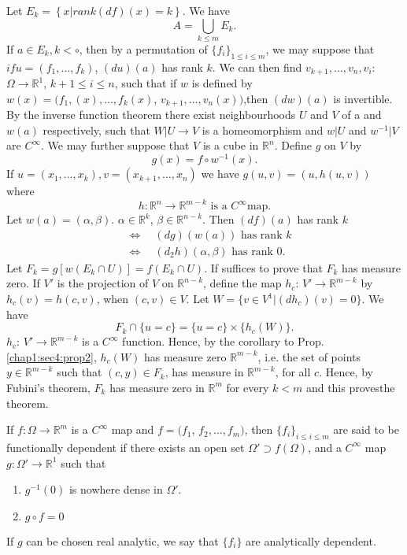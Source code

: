 \setcounter{proof of theorem}{0}
\begin{proof of theorem}\label{chap1:sec4:pot1}%
  Let $E_k = \left\{ x | rank (df)(x) = k\right\}$. We have 
  $$
  A = \bigcup _{ k \leq m} E_k. 
  $$
  If $a \in E_k, k <\circ$, then by a permutation of $\{f_i\} _{ 1 \leq i \leq
    m}$, we may suppose that $if u = ( f _1, \ldots, f_k)$, $(du) (a)$
  has rank $k$. We can then find $v_{ k +1},\ldots , v_n , v_i$:
  $\Omega \to \mathbb{R}^1$, $k +1 \leq i \leq n$, such that if $w$ is
  defined by $w(x) = (f_1, (x) , \ldots , f_k (x)$, $v_{k +1} , \ldots
  , v_n (x))$,\pageoriginale then $(dw) (a)$ is invertible. By the inverse function
  theorem there exist neighbourhoods $U$ and $V$ of a and $w(a)$
  respectively, such that $W | U \to V$ is a homeomorphism and $w | U$
  and $w^{-1} | V $ are $C^\infty$. We may further suppose that $V$ is
  a cube in $\mathbb{R}^n$. Define $g$ on $V$ by  
  $$
  g(x) = f \circ w ^{-1} (x).
  $$
  If $u = (x_1, \ldots , x_k) , v = (x_{k +1}, \ldots , x_n)$ we have
  $g (u, v) = (u, h (u, v))$ where  
  $$
  h : \mathbb{R}^n \to \mathbb{R}^{ m- k} \text{ is a } C^\infty \text{map}. 
  $$
  Let $w (a) = (\alpha , \beta)$. $\alpha \in \mathbb{R}^k$, $\beta
  \in \mathbb{R}^{ n -k}$. Then $(df)(a)$ has rank $k$ 
  \begin{align*}
    & \Leftrightarrow  \quad (dg) (w(a)) \text{ has rank }k \\
    &\Leftrightarrow \quad (d_2 h ) (\alpha, \beta)\text{ has rank } 0.
  \end{align*}
  Let $F_k=g [ w (E_k \cap U)] = f (E_k \cap U)$. If suffices to
  prove that $F_k$ has measure zero. If  $V'$ is the projection of $V$
  on $\mathbb{R}^{ n-k}$, define the map $h_c$: $V' \to \mathbb{R}^{ m
    -k}$ by $h_c (v) = h (c, v)$, when $(c, v) \in V$. Let $W = \{v
  \in V^1 | (dh_c) (v) = 0\}$. We have  
  $$
  F_k \cap \{ u = c\} = \{ u = c\} \times \{ h_c (W )\}.
  $$
  $h_c$: $V' \to \mathbb{R}^{ m - k}$ is a $C^\infty$ function. Hence,
  by the corollary to Prop. \ref{chap1:sec4:prop2}, $h_c (W)$ has measure zero
  $\mathbb{R}^{ m - k}$, i.e. the set of points $y \in \mathbb{R}^{m
    -k}$ such that $(c, y) \in F_k$, has measure in $\mathbb{R}^{ m -
    k}$, for all $c$. Hence, by Fubini's theorem, $F_k$ has measure
  zero in $\mathbb{R}^m$ for every $k < m$ and this proves\pageoriginale the
  theorem.  
\end{proof of theorem}

\begin{defi*}%
  If $f: \Omega\to \mathbb{R}^m$ is a $C^\infty$ map and $f = (f _1$,
  $f_2 , \ldots, f_m)$, then $\{f_i\}_{ i \leq i \leq m}$ are said to
  be functionally dependent if there exists an open set $\Omega'
  \supset f (\Omega)$, and a $C^\infty$ map $g: \Omega'
  \to\mathbb{R}^1$ such that 
  \begin{enumerate}[(1)]
  \item $g^{-1} (0)$ is nowhere dense in $\Omega'$. 
  \item $g \circ f = 0$
  \end{enumerate}
  If $g$ can be chosen real analytic, we say that $\{ f_i \}$ are
  analytically dependent. 
\end{defi*}

